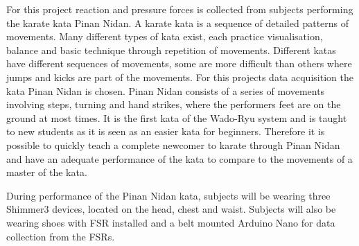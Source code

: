 For this project reaction and pressure forces is collected from subjects performing the karate kata Pinan Nidan. %
A karate kata is a sequence of detailed patterns of movements. Many different types of kata exist, each practice visualisation, balance and basic technique through repetition of movements. Different katas have different sequences of movements, some are more difficult than others where jumps and kicks are part of the movements. For this projects data acquisition the kata Pinan Nidan is chosen. Pinan Nidan consists of a series of movements involving steps, turning and hand strikes, where the performers feet are on the ground at most times. It is the first kata of the Wado-Ryu system and is taught to new students as it is seen as an easier kata for beginners. \cite{Mccarthy1987} Therefore it is possible to quickly teach a complete newcomer to karate through Pinan Nidan and have an adequate performance of the kata to compare to the movements of a master of the kata. 

During performance of the Pinan Nidan kata, subjects will be wearing three Shimmer3 devices, located on the head, chest and waist. Subjects will also be wearing shoes with FSR installed and a belt mounted Arduino Nano for data collection from the FSRs. 
